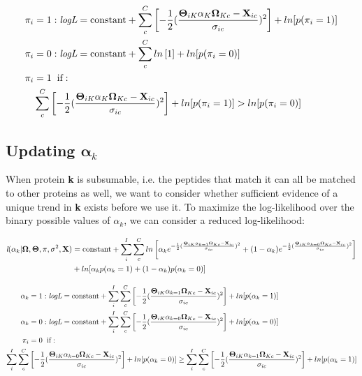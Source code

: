 \begin{align}
\pi_{i} &= 1: \textit{logL} = \text{constant} + \sum_{c}^{C}\left[{-\frac{1}{2}(\frac{\mathbf{\Theta}_{iK}\alpha_{K}\mathbf{\Omega}_{Kc} - \textbf{X}_{ic}}{\sigma_{ic}})^2}\right] + ln[p(\pi_{i} = 1)]\notag\\
\pi_{i} &= 0: \textit{logL} = \text{constant} + \sum_{c}^{C}ln\left[1\right] + ln[p(\pi_{i} = 0)]\notag\\
\pi_{i} &= 1 \hspace{2mm}\text{if}:\notag\\ & \sum_{c}^{C}\left[{-\frac{1}{2}(\frac{\mathbf{\Theta}_{iK}\alpha_{K}\mathbf{\Omega}_{Kc} - \textbf{X}_{ic}}{\sigma_{ic}})^2}\right] + ln[p(\pi_{i} = 1)] > ln[p(\pi_{i} = 0)]\label{EM:pi}
\end{align}

\subsection*{Updating $\mathbf{\alpha}_{k}$}

When protein \textbf{k} is subsumable, i.e. the peptides that match it can all be matched to other proteins as well, we want to consider whether sufficient evidence of a unique trend in \textbf{k} exists before we use it. To maximize the log-likelihood over the binary possible values of $\alpha_{k}$, we can consider a reduced log-likelihood:

\footnotesize
\begin{align}
\textit{l}(\alpha_{k} | \mathbf{\Omega}, \mathbf{\Theta}, \pi, \sigma^{2}, \textbf{X}) &= \text{constant} + \sum_{i}^{I}\sum_{c}^{C}ln\left[\alpha_{k}e^{-\frac{1}{2}(\frac{\mathbf{\Theta}_{iK}\alpha_{k  = 1}\mathbf{\Omega}_{Kc} - \textbf{X}_{ic}}{\sigma_{ic}})^2} + (1-\alpha_{k})e^{-\frac{1}{2}(\frac{\mathbf{\Theta}_{iK}\alpha_{k  = 0}\mathbf{\Omega}_{Kc} - \textbf{X}_{ic}}{\sigma_{ic}})^2}\right]\notag\\
&+ ln[\alpha_{k}p(\alpha_{k} = 1) + (1-\alpha_{k})p(\alpha_{k} = 0)]\label{EM:alpha}
\end{align}

\begin{align}
\alpha_{k} &= 1: \textit{logL} = \text{constant} + \sum_{i}^{I}\sum_{c}^{C}\left[{-\frac{1}{2}(\frac{\mathbf{\Theta}_{iK}\alpha_{k  = 1}\mathbf{\Omega}_{Kc} - \textbf{X}_{ic}}{\sigma_{ic}})^2}\right] + ln[p(\alpha_{k} = 1)]\notag\\
\alpha_{k} &= 0: \textit{logL} = \text{constant} + \sum_{i}^{I}\sum_{c}^{C}\left[{-\frac{1}{2}(\frac{\mathbf{\Theta}_{iK}\alpha_{k  = 0}\mathbf{\Omega}_{Kc} - \textbf{X}_{ic}}{\sigma_{ic}})^2}\right] + ln[p(\alpha_{k} = 0)]\notag\\
\pi_{i} &= 0 \hspace{2mm}\text{if}:\notag\\ \sum_{i}^{I}\sum_{c}^{C}&\left[{-\frac{1}{2}(\frac{\mathbf{\Theta}_{iK}\alpha_{k  = 0}\mathbf{\Omega}_{Kc} - \textbf{X}_{ic}}{\sigma_{ic}})^2}\right] + ln[p(\alpha_{k} = 0)] \ge \sum_{i}^{I}\sum_{c}^{C}\left[{-\frac{1}{2}(\frac{\mathbf{\Theta}_{iK}\alpha_{k  = 1}\mathbf{\Omega}_{Kc} - \textbf{X}_{ic}}{\sigma_{ic}})^2}\right] + ln[p(\alpha_{k} = 1)]
\end{align}
\normalsize


